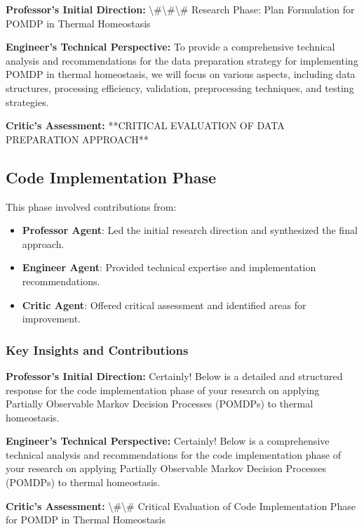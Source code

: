 \documentclass[11pt,a4paper]{article}
\begin{document}
\textbf{Professor's Initial Direction:} \textbackslash{}#\textbackslash{}#\textbackslash{}# Research Phase: Plan Formulation for POMDP in Thermal Homeostasis


\textbf{Engineer's Technical Perspective:} To provide a comprehensive technical analysis and recommendations for the data preparation strategy for implementing POMDP in thermal homeostasis, we will focus on various aspects, including data structures, processing efficiency, validation, preprocessing techniques, and testing strategies.


\textbf{Critic's Assessment:} **CRITICAL EVALUATION OF DATA PREPARATION APPROACH**


\subsection{Code Implementation Phase}


This phase involved contributions from:

\begin{itemize}
\item \textbf{Professor Agent}: Led the initial research direction and synthesized the final approach.
\item \textbf{Engineer Agent}: Provided technical expertise and implementation recommendations.
\item \textbf{Critic Agent}: Offered critical assessment and identified areas for improvement.
\end{itemize}

\subsubsection{Key Insights and Contributions}


\textbf{Professor's Initial Direction:} Certainly! Below is a detailed and structured response for the code implementation phase of your research on applying Partially Observable Markov Decision Processes (POMDPs) to thermal homeostasis.


\textbf{Engineer's Technical Perspective:} Certainly! Below is a comprehensive technical analysis and recommendations for the code implementation phase of your research on applying Partially Observable Markov Decision Processes (POMDPs) to thermal homeostasis.


\textbf{Critic's Assessment:} \textbackslash{}#\textbackslash{}# Critical Evaluation of Code Implementation Phase for POMDP in Thermal Homeostasis
\end{document}
